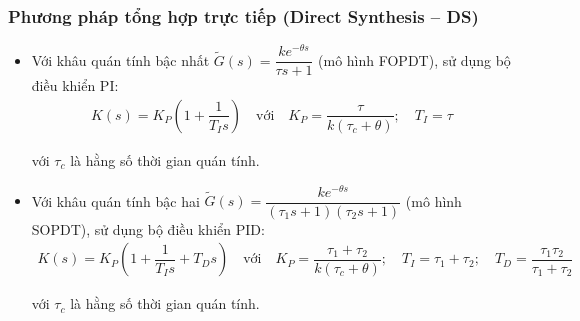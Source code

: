 \subsubsection{Phương pháp tổng hợp trực tiếp (Direct Synthesis -- DS)}
    \begin{itemize}
        \item Với khâu quán tính bậc nhất $\tilde{G}(s) = \dfrac{k e^{-\theta s}}{\tau s + 1}$ (mô hình FOPDT), sử dụng bộ điều khiển PI:
        \begin{align*}
            K(s) = K_P \left({1 + \dfrac{1}{T_I s}}\right) \quad \textrm{với} \quad K_P = \dfrac{\tau}{k\left({\tau_c + \theta}\right)}; \quad T_I = \tau
        \end{align*}

        với $\tau_c$ là hằng số thời gian quán tính.

        \item Với khâu quán tính bậc hai $\tilde{G}(s) = \dfrac{k e^{-\theta s}}{\left({\tau_1 s + 1}\right) \left({\tau_2 s + 1}\right)}$ (mô hình SOPDT), sử dụng bộ điều khiển PID:
            \begin{align*}
                K(s) = K_P \left({1 + \dfrac{1}{T_I s} + T_D s}\right) \quad \textrm{với} \quad K_P = \dfrac{\tau_1 + \tau_2}{k\left({\tau_c + \theta}\right)}; \quad T_I = \tau_1 + \tau_2; \quad T_D = \dfrac{\tau_1 \tau_2}{\tau_1 + \tau_2}
            \end{align*}

        với $\tau_c$ là hằng số thời gian quán tính.
    \end{itemize}

